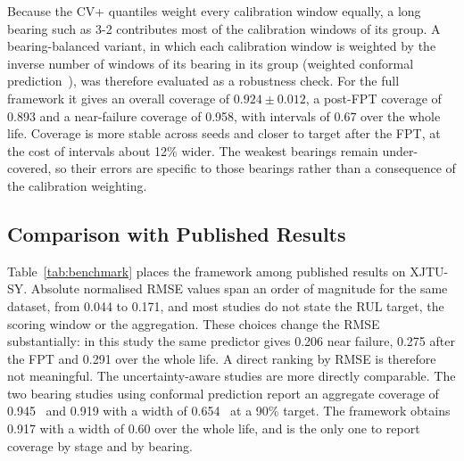 Because the CV+ quantiles weight every calibration window equally, a
long bearing such as 3-2 contributes most of the calibration windows of
its group. A bearing-balanced variant, in which each calibration window
is weighted by the inverse number of windows of its bearing in its
group (weighted conformal prediction~\cite{tibshirani2019conformal}),
was therefore evaluated as a robustness check. For the full framework
it gives an overall coverage of $0.924 \pm 0.012$, a post-FPT coverage
of 0.893 and a near-failure coverage of 0.958, with intervals of 0.67
over the whole life. Coverage is more stable across seeds and closer to
target after the FPT, at the cost of intervals about 12\% wider. The
weakest bearings remain under-covered, so their errors are specific to
those bearings rather than a consequence of the calibration weighting.

\subsection{Comparison with Published Results}
\label{sec:res_benchmark}

Table~\ref{tab:benchmark} places the framework among published results
on XJTU-SY. Absolute normalised RMSE values span an order of magnitude
for the same dataset, from 0.044 to 0.171, and most studies do not
state the RUL target, the scoring window or the aggregation. These
choices change the RMSE substantially: in this study the same
predictor gives 0.206 near failure, 0.275 after the FPT and 0.291 over
the whole life. A direct ranking by RMSE is therefore not meaningful.
The uncertainty-aware studies are more directly comparable. The two
bearing studies using conformal prediction report an aggregate coverage
of 0.945~\cite{wang_uncertainty-aware_2026} and 0.919 with a width of
0.654~\cite{11373138} at a 90\% target. The framework obtains 0.917
with a width of 0.60 over the whole life, and is the only one to report
coverage by stage and by bearing.

